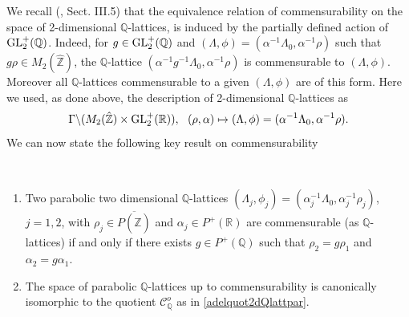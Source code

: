 \documentclass[graybox, envcountsect%
]{svmult}
\def\GL{{\rm GL}}
\def\Q{{\mathbb Q}}
\def\R{{\mathbb R}}
\def\Z{{\mathbb Z}}
\def\cC{{\mathcal C}}
\def\caqo{{\cC_\Q^o}}
\begin{document}
We recall   (\!\cite{cmbook}, Sect. III.5) that the equivalence relation of commensurability on the space of 
2-dimensional $\Q$-lattices, is induced by the partially defined action of
$\GL_2^+(\Q)$.  Indeed, for $g\in \GL_2^+(\Q)$
and $(\Lambda,\phi)=(\alpha^{-1}\Lambda_0,\alpha^{-1}\rho)$ such
that $g\rho\in M_2(\hat\Z)$, the $\Q$-lattice $(\alpha^{-1} g^{-1}
\Lambda_0, \alpha^{-1}\rho)$ is commensurable to $(\Lambda,\phi)$.
Moreover all $\Q$-lattices commensurable to a given
$(\Lambda,\phi)$ are of this form. Here we used, as done above, the description of 2-dimensional $\Q$-lattices as 
$$
\Gamma\backslash (M_2(\hat\Z)\times \GL_2^+(\R)),\ \ (\rho,\alpha)\mapsto (\Lambda,\phi)=(\alpha^{-1}\Lambda_0, \alpha^{-1}\rho).
$$
We can now state the following key result on commensurability

\begin{theorem}\label{comparecomm}\
\begin{enumerate}
\item[(i)] Two parabolic two dimensional $\Q$-lattices $(\Lambda_j,\phi_j)=(\alpha_j^{-1}\Lambda_0, \alpha_j^{-1}\rho_j)$, $j=1,2$, with $\rho_j\in \overline{P(\hat \Z)}$ and $\alpha_j\in P^+(\R)$ are commensurable (as $\Q$-lattices) if and only if there exists $g\in P^+(\Q)$ such that $\rho_2=g\rho_1$ and $\alpha_2=g\alpha_1$.	
\item[(ii)] The space of parabolic $\Q$-lattices up to commensurability is canonically isomorphic to the quotient $\caqo$ as in  \eqref{adelquot2dQlattpar}.
\end{enumerate}
\end{theorem}
\end{document}
